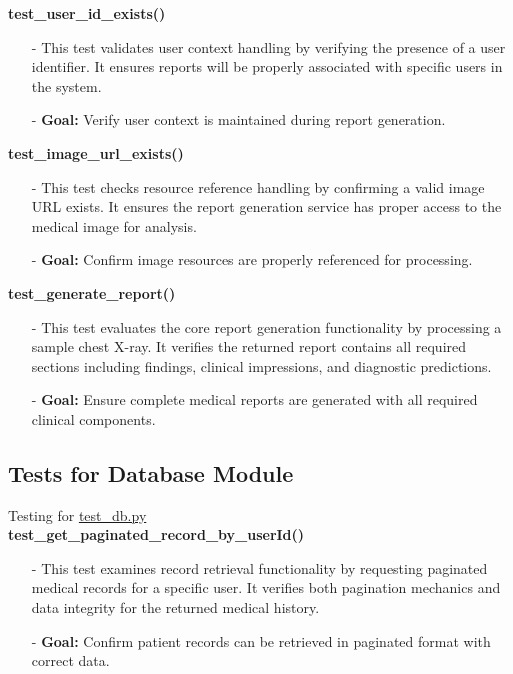 \documentclass[12pt, titlepage]{article}
\begin{document}
\textbf{test\_user\_id\_exists()}
\begin{itemize}
    \item[-] This test validates user context handling by verifying the presence of a user identifier. It ensures reports will be properly associated with specific users in the system.
    \item[-] \textbf{Goal:} Verify user context is maintained during report generation.
\end{itemize}

\textbf{test\_image\_url\_exists()}
\begin{itemize}
    \item[-] This test checks resource reference handling by confirming a valid image URL exists. It ensures the report generation service has proper access to the medical image for analysis.
    \item[-] \textbf{Goal:} Confirm image resources are properly referenced for processing.
\end{itemize}

\textbf{test\_generate\_report()}
\begin{itemize}
    \item[-] This test evaluates the core report generation functionality by processing a sample chest X-ray. It verifies the returned report contains all required sections including findings, clinical impressions, and diagnostic predictions.
    \item[-] \textbf{Goal:} Ensure complete medical reports are generated with all required clinical components.
\end{itemize}

\subsection{Tests for Database Module}
Testing for \href{https://github.com/RezaJodeiri/CXR-Capstone/blob/main/src/backend/test/test_db.py}{test\_db.py} \\ 

\textbf{test\_get\_paginated\_record\_by\_userId()}
\begin{itemize}
    \item[-] This test examines record retrieval functionality by requesting paginated medical records for a specific user. It verifies both pagination mechanics and data integrity for the returned medical history.
    \item[-] \textbf{Goal:} Confirm patient records can be retrieved in paginated format with correct data.
\end{itemize}
\end{document}
